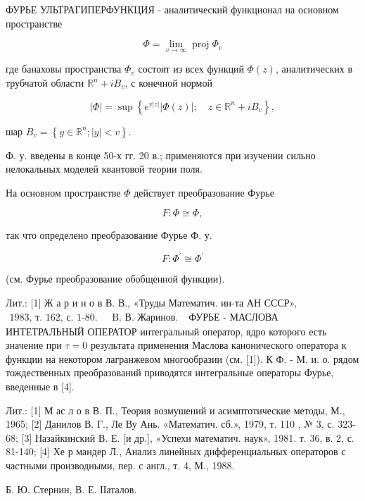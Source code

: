 \documentclass[10pt]{article}
\begin{document}
ФУРЬЕ УЛЬТРАГИПЕРФУНКЦИЯ - аналитический функционал на основном пространстве



\[

\Phi=\lim _{v \rightarrow \infty} \operatorname{proj} \Phi_{v}

\]



где банаховы пространства $\Phi_{v}$ состоят из всех функций $\Phi(z)$, аналитических в трубчатой области $\mathbb{R}^{n}+i B_{v}$, с конечной нормой



\[

|\Phi|=\sup \left\{e^{v|z|}|\Phi(z)| ; \quad z \in \mathbb{R}^{n}+i B_{v}\right\},

\]



шар $B_{v}=\left\{y \in \mathbb{R}^{n} ;|y|<v\right\}$.



Ф. у. введены в конце 50-х гг. 20 в.; применяются при изучении сильно нелокальных моделей квантовой теории поля.



На основном пространстве $\Phi$ действует преобразование Фурье



\[

F: \Phi \cong \Phi,

\]



так что определено преобразование Фурье Ф. у.



\[

F: \Phi^{\prime} \cong \Phi^{\prime}

\]



(см. Фурье преобразование обобщенной функции).



Лит.: [1] Ж а р и н о в В. В., «Труды Математич. ин-та АН СССР», $\begin{array}{ll}1983 \text {, т. 162, с. 1-80. } & \text { B. В. Жаринов. }\end{array}$ ФУРЬЕ - МАСЛОВА ИНТЕТРАЛЬНЫЙ ОПЕРАТОР интегральный оператор, ядро которого есть значение при $\tau=0$ результата применения Маслова канонического оператора к функции на некотором лагранжевом многообразии (см. [1]). К Ф. - М. и. о. рядом тождественных преобразований приводятся интегральные операторы Фурье, введенные в [4].



Лит.: [1] М ас л о в В. П., Теория возмушений и асимптотические методы, М., 1965; [2] Данилов В. Г., Ле Ву Ань. «Математич. сб.», 1979, т. 110 , № 3, с. 323-68; [3] Назайкинский В. Е. [и др.], «Успехи математич. наук», 1981. т. 36, в. 2, с. 81-140; [4] Хе р мандер Л., Анализ линейных дифференциальных операторов с частными производными, пер. с англ., т. 4, М., 1988.



Б. Ю. Стернин, В. Е. ІІаталов.
\end{document}
